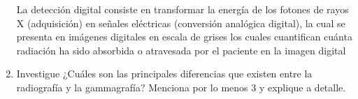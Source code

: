 \begin{enumerate}[1.]
La detección digital consiste en transformar la energía de los fotones de rayos X (adquisición) en señales eléctricas (conversión analógica digital), la cual se presenta en imágenes digitales en escala de grises los cuales cuantifican cuánta radiación ha sido absorbida o atravesada por el paciente en la imagen digital








\item Investigue ¿Cuáles son las principales diferencias que existen entre la radiografía y la gammagrafía? Menciona por lo menos 3 y explique a detalle.














\end{enumerate}


\begin{multicols}{2}
\small{
}
\end{multicols}








